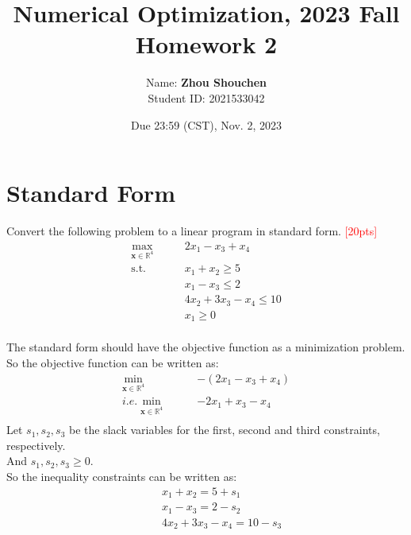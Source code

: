 \documentclass[10pt]{article}
\begin{document}
\title{	Numerical Optimization, 2023 Fall\\Homework 2}
\date{Due 23:59 (CST), Nov. 2, 2023 }

\author{
    Name: \textbf{Zhou Shouchen} \\
	Student ID: 2021533042
}

\maketitle

\newpage

\section{Standard Form}
Convert the following problem to a linear program in standard form. \textcolor{red}{[20pts]}~
\begin{equation}
	\begin{aligned}
		\max_{\bm{x} \in \mathbb{R}^{4}}\qquad & 2x_{1} - x_{3} + x_{4} \\
		\mathrm{s.t.}\qquad & x_{1} + x_{2} \geq 5 \\
		& x_{1} - x_{3} \leq 2 \\
		& 4x_{2} + 3x_{3} - x_{4} \leq 10 \\
		& x_{1} \geq 0 \\
	\end{aligned}
\end{equation}

The standard form should have the objective function as a minimization problem.\\
So the objective function can be written as:\\
\begin{equation}
	\begin{aligned}
		\min_{\bm{x} \in \mathbb{R}^{4}}\qquad & -(2x_{1} - x_{3} + x_{4}) \\
		i.e.
		\min_{\bm{x} \in \mathbb{R}^{4}}\qquad & -2x_{1} + x_{3} - x_{4} \\
	\end{aligned}
\end{equation}
Let $s_1,s_2,s_3$ be the slack variables for the first, second and third constraints, respectively.\\
And $s_1,s_2,s_3\geq 0$.\\
So the inequality constraints can be written as:\\
\begin{equation}
	\begin{aligned}
		 \qquad & x_{1} + x_{2} = 5 + s_1 \\
				& x_{1} - x_{3} = 2 - s_2 \\
				& 4x_{2} + 3x_{3} - x_{4} = 10 - s_3 \\
	\end{aligned}
\end{equation}
\end{document}

